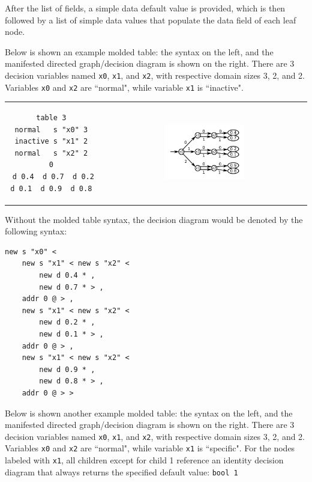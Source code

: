 \documentclass{article}
\begin{document}
After the list of \underline{} fields, a simple data default value \underline{} is provided, which is then followed by a list of simple data values \underline{} that populate the data field of each leaf node.

Below is shown an example molded table: the syntax on the left, and the manifested directed graph/decision diagram is shown on the right. There are 3 decision variables named \texttt{x0}, \texttt{x1}, and \texttt{x2}, with respective domain sizes 3, 2, and 2. Variables \texttt{x0} and \texttt{x2} are ``normal", while variable \texttt{x1} is ``inactive".

\begin{tabular}{cc}
\begin{minipage}[b]{0.4\textwidth}
\begin{verbatim}
table 3 
normal   s "x0" 3 
inactive s "x1" 2 
normal   s "x2" 2 
0 
d 0.4  d 0.7  d 0.2  d 0.1  d 0.9  d 0.8 
\end{verbatim}
\end{minipage} & 
\includegraphics[width = 0.4\textwidth]{example_molded_array.pdf} \\
\end{tabular}

\vspace{5mm}

Without the molded table syntax, the decision diagram would be denoted by the following syntax:

\begin{verbatim}
new s "x0" < 
    new s "x1" < new s "x2" < 
        new d 0.4 * , 
        new d 0.7 * > , 
    addr 0 @ > , 
    new s "x1" < new s "x2" < 
        new d 0.2 * , 
        new d 0.1 * > , 
    addr 0 @ > , 
    new s "x1" < new s "x2" < 
        new d 0.9 * , 
        new d 0.8 * > , 
    addr 0 @ > >
\end{verbatim}

\vspace{5mm}

Below is shown another example molded table: the syntax on the left, and the manifested directed graph/decision diagram is shown on the right. There are 3 decision variables named \texttt{x0}, \texttt{x1}, and \texttt{x2}, with respective domain sizes 3, 2, and 2. Variables \texttt{x0} and \texttt{x2} are ``normal", while variable \texttt{x1} is ``specific". For the nodes labeled with \texttt{x1}, all children except for child 1 reference an identity decision diagram that always returns the specified default value: \texttt{bool 1}
\end{document}
